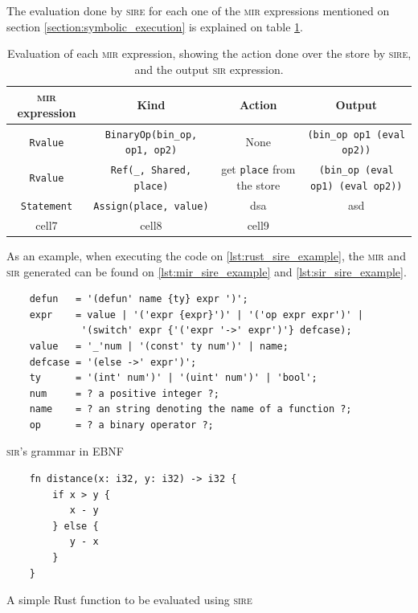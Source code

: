 The evaluation done by \textsc{sire} for each one of the \textsc{mir}
expressions mentioned on section \ref{section:symbolic_execution} is explained
on table \ref{tab:sire_table}.

\begin{table}[ht]
    \centering
    \begin{tabular}{ | c | c | c | c | }
        \hline
        \textsc{mir} expression & Kind & Action & Output \\ 
        \hline 
        \texttt{Rvalue} & \texttt{BinaryOp(bin\_op, op1, op2)} & None & \texttt{(bin\_op op1 (eval op2))} \\
        \texttt{Rvalue} & \texttt{Ref(\_, Shared, place)} & get \texttt{place} from the store & \texttt{(bin\_op (eval op1) (eval op2))} \\
        \texttt{Statement} & \texttt{Assign(place, value)} & dsa & asd \\  
        cell7 & cell8 & cell9 \\
        \hline
    \end{tabular}
    \caption{Evaluation of each \textsc{mir} expression, showing the action
    done over the store by \textsc{sire}, and the output \textsc{sir}
    expression. }
  \label{tab:sire_table}
\end{table}


As an example, when executing the code on \ref{lst:rust_sire_example}, the
\textsc{mir} and \textsc{sir} generated can be found on
\ref{lst:mir_sire_example} and \ref{lst:sir_sire_example}.

\begin{listing}[ht]
    \begin{verbatim}
    defun   = '(defun' name {ty} expr ')';
    expr    = value | '('expr {expr}')' | '('op expr expr')' | 
             '(switch' expr {'('expr '->' expr')'} defcase);
    value   = '_'num | '(const' ty num')' | name;
    defcase = '(else ->' expr')';
    ty      = '(int' num')' | '(uint' num')' | 'bool';
    num     = ? a positive integer ?;
    name    = ? an string denoting the name of a function ?;
    op      = ? a binary operator ?;
    \end{verbatim}
    \caption{\textsc{sir}'s grammar in EBNF}
  \label{lst:sir_grammar}
\end{listing}

\begin{listing}[ht]
    \begin{verbatim}
    fn distance(x: i32, y: i32) -> i32 {
        if x > y {
           x - y
        } else {
           y - x
        }
    }
    \end{verbatim}
    \caption{A simple Rust function to be evaluated using \textsc{sire}}
  \label{lst:rust_sire_example}
\end{listing}

